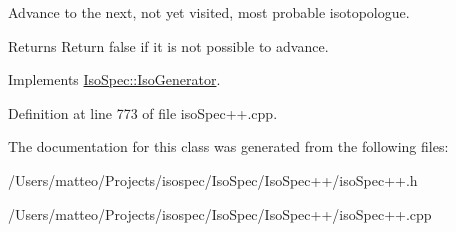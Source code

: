 Advance to the next, not yet visited, most probable isotopologue. 

\begin{DoxyReturn}{Returns}
Return false if it is not possible to advance. 
\end{DoxyReturn}


Implements \mbox{\hyperlink{class_iso_spec_1_1_iso_generator_a20f48ba18c6aecc57d73b2c3ec3a11dd}{Iso\+Spec\+::\+Iso\+Generator}}.



Definition at line 773 of file iso\+Spec++.\+cpp.



The documentation for this class was generated from the following files\+:\begin{DoxyCompactItemize}
\item 
/\+Users/matteo/\+Projects/isospec/\+Iso\+Spec/\+Iso\+Spec++/iso\+Spec++.\+h\item 
/\+Users/matteo/\+Projects/isospec/\+Iso\+Spec/\+Iso\+Spec++/iso\+Spec++.\+cpp\end{DoxyCompactItemize}
